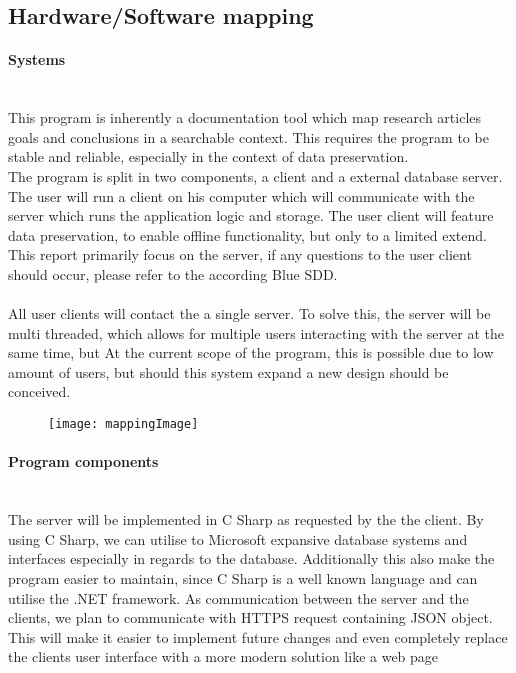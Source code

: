 \subsection{Hardware/Software mapping}
\paragraph{Systems}\mbox{}\\
This program is inherently a documentation tool which map research articles goals and conclusions in a searchable context. This requires the program to be stable and reliable, especially  in the context of data preservation. \\The program is split in two components, a client and a external database  server. The user will run a client on his computer which will communicate with the server which runs the application logic and storage. The user client will feature data preservation, to enable offline functionality, but only to a limited extend. This report primarily focus on the server, if any questions to the user client should occur,  please refer to the according Blue SDD.\\ \\
All user clients will contact the a single server. To solve this, the server will be multi threaded, which allows for multiple users interacting with the server at the same time, but  At the current scope of the program, this is possible due to low amount of users, but should this system expand a new design should be conceived. \\
\begin{figure}[H]
	\texttt{[image: mappingImage]}
\end{figure}
\paragraph{Program components}\mbox{}\\
The server will be implemented in C Sharp as requested by the the client. By using C Sharp, we can utilise to Microsoft expansive database systems and interfaces especially in regards to the database. Additionally this also make the program easier to maintain, since C Sharp is a well known language and can utilise the .NET framework. As communication between the server and the clients, we plan to communicate with HTTPS  request containing JSON object. This will make it easier to implement future changes and even completely replace the clients user interface with a more modern solution like a web page
